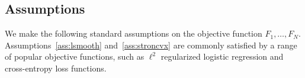 




\subsection{Assumptions}
\label{sec:assumptions}
We make the following standard assumptions on the objective function $F_1,\dots, F_N$. Assumptions~\ref{ass:lsmooth} and~\ref{ass:stroncvx} are commonly satisfied by a range of popular objective functions, such as $\ell^{2}$ regularized logistic regression and cross-entropy loss functions.

